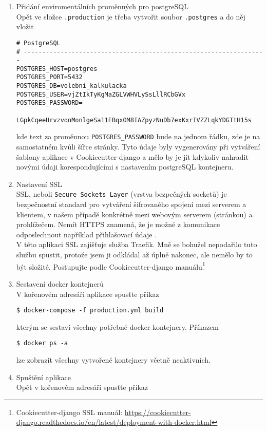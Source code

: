 \begin{enumerate}
\item Přidání enviromentálních proměnných pro postgreSQL\\
Opět ve složce \texttt{.production} je třeba vytvořit soubor \texttt{.postgres} a do něj vložit

\begin{verbatim}
# PostgreSQL
# ------------------------------------------------------------------
POSTGRES_HOST=postgres
POSTGRES_PORT=5432
POSTGRES_DB=volebni_kalkulacka
POSTGRES_USER=vjZtIkTyKgMaZGLVWHVLySsLllRCbGVx
POSTGRES_PASSWORD=
    LGpkCqeeUrvzvonMonlgeSa11EBqxOM8IAZpyzNuDb7exKxrIVZZLqkYDGTtH15s
\end{verbatim}

kde text za proměnnou \texttt{POSTGRES\_PASSWORD} bude na jednom řádku, zde je na samostatném kvůli šířce stránky. Tyto údaje byly vygenerovány při vytváření šablony aplikace v Cookiecutter-django a mělo by je jít kdykoliv nahradit novými údaji korespondujícími s nastavením postgreSQL kontejneru.


\item Nastavení SSL\\
SSL, neboli \texttt{Secure Sockets Layer} (vrstva bezpečných socketů) je bezpečnostní standard pro vytváření šifrovaného spojení mezi serverem a klientem, v našem případě konkrétně mezi webovým serverem (stránkou) a prohlížečem. Nemít HTTPS znamená, že je možné z komunikace odposlechnout například přihlašovací údaje \cite{cookiecutter-ssl}.
\\

V této aplikaci SSL zajišťuje služba Traefik. Mně se bohužel nepodařilo tuto službu spustit, protože jsem ji odkládal až úplně nakonec, ale nemělo by to být složité. Postupujte podle Cookiecutter-django manuálu\footnote{Cookiecutter-django SSL manuál: \url{https://cookiecutter-django.readthedocs.io/en/latest/deployment-with-docker.html}}

\item Sestavení docker kontejnerů\\
V kořenovém adresáři aplikace spusťte příkaz

\texttt{\$ docker-compose -f production.yml build}

kterým se sestaví všechny potřebné docker kontejnery. Příkazem

\texttt{\$ docker ps -a}

lze zobrazit všechny vytvořené kontejnery včetně neaktivních.

\item Spuštění aplikace\\
Opět v kořenovém adresáři spusťte příkaz


\end{enumerate}
